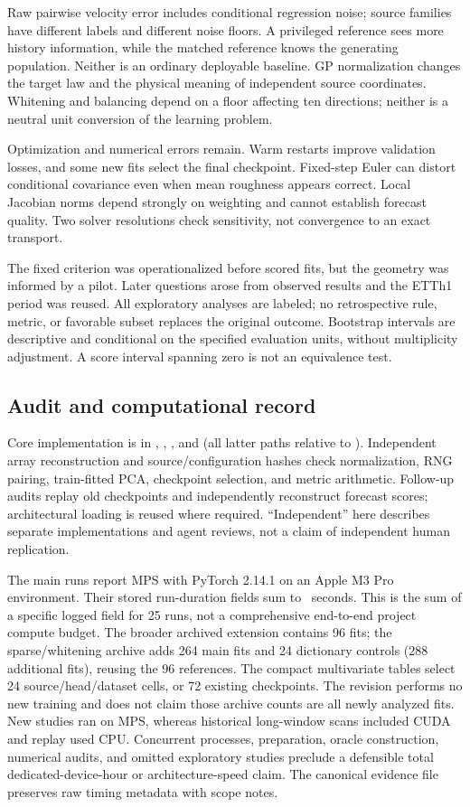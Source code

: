 \documentclass[10pt,twocolumn]{article}
\newcommand{\src}[1]{\texttt{\path{#1}}}
\begin{document}
Raw pairwise velocity error includes conditional regression noise; source families have different labels and different noise floors. A privileged reference sees more history information, while the matched reference knows the generating population. Neither is an ordinary deployable baseline. GP normalization changes the target law and the physical meaning of independent source coordinates. Whitening and balancing depend on a floor affecting ten directions; neither is a neutral unit conversion of the learning problem.

Optimization and numerical errors remain. Warm restarts improve validation losses, and some new fits select the final checkpoint. Fixed-step Euler can distort conditional covariance even when mean roughness appears correct. Local Jacobian norms depend strongly on weighting and cannot establish forecast quality. Two solver resolutions check sensitivity, not convergence to an exact transport.

The fixed criterion was operationalized before scored fits, but the geometry was informed by a pilot. Later questions arose from observed results and the ETTh1 period was reused. All exploratory analyses are labeled; no retrospective rule, metric, or favorable subset replaces the original outcome. Bootstrap intervals are descriptive and conditional on the specified evaluation units, without multiplicity adjustment. A score interval spanning zero is not an equivalence test.

\subsection{Audit and computational record}
Core implementation is in \src{fm_stress/data.py}, \src{models.py}, \src{experiment.py}, and \src{metrics.py} (all latter paths relative to \src{fm_stress/}). Independent array reconstruction and source/configuration hashes check normalization, RNG pairing, train-fitted PCA, checkpoint selection, and metric arithmetic. Follow-up audits replay old checkpoints and independently reconstruct forecast scores; architectural loading is reused where required. ``Independent'' here describes separate implementations and agent reviews, not a claim of independent human replication.

The main runs report MPS with PyTorch 2.14.1 on an Apple M3 Pro environment. Their stored run-duration fields sum to \MainLoggedSeconds\ seconds. This is the sum of a specific logged field for 25 runs, not a comprehensive end-to-end project compute budget. The broader archived extension contains 96 fits; the sparse/whitening archive adds 264 main fits and 24 dictionary controls (288 additional fits), reusing the 96 references. The compact multivariate tables select 24 source/head/dataset cells, or 72 existing checkpoints. The revision performs no new training and does not claim those archive counts are all newly analyzed fits. New studies ran on MPS, whereas historical long-window scans included CUDA and replay used CPU. Concurrent processes, preparation, oracle construction, numerical audits, and omitted exploratory studies preclude a defensible total dedicated-device-hour or architecture-speed claim. The canonical evidence file preserves raw timing metadata with scope notes.
\end{document}
